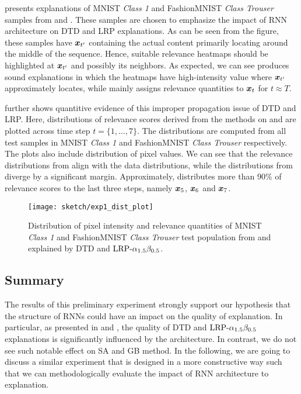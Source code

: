 \addfigure{\ref{fig:class_1_comparison}} presents explanations of MNIST \textit{Class 1} and FashionMNIST \textit{Class Trouser} samples from  and . These samples are chosen to emphasize the impact of RNN architecture on DTD and LRP explanations. As can be seen from the figure, these samples have $\boldsymbol{x}_{t'}$ containing the actual content primarily locating around the middle of the sequence. Hence, suitable relevance heatmaps should be highlighted at $\boldsymbol{x}_{t'}$ and possibly its neighbors.  As expected, we can see  produces sound explanations in which the heatmaps have high-intensity value where $\boldsymbol{x}_{t'}$ approximately locates, while  mainly assigns relevance quantities to $\boldsymbol{x}_{t}$ for $t \approx T$. 

\addfigure{\ref{fig:exp1_dist_plot}} further shows quantitive evidence of this improper propagation issue of DTD and LRP. Here, distributions of relevance scores derived from the methods on  and  are plotted across time step $t = \{ 1, \dots, 7 \}$. The distributions are computed from all test samples in MNIST \textit{Class 1} and FashionMNIST \textit{Class Trouser} respectively. The plots also include distribution of pixel  values.  We can see that the relevance distributions from  align with the data distributions, while  the distributions from   diverge by a significant margin. Approximately,  distributes more than 90\% of relevance scores to the last three steps, namely $\boldsymbol{x}_5$, $\boldsymbol{x}_6$ and $\boldsymbol{x}_7$.


 \begin{figure}[!htb]
\centering
\texttt{[image: sketch/exp1\_dist\_plot]}
\caption{Distribution of pixel intensity and relevance quantities of MNIST \textit{Class 1} and FashionMNIST \textit{Class Trouser}  test population from  and  explained by DTD and $\text{LRP-}\alpha_{1.5}\beta_{0.5}$.} 
\label{fig:exp1_dist_plot}
\end{figure}

\subsection{Summary}
The results of this preliminary experiment strongly support our hypothesis that the structure of RNNs could have an impact on the quality of  explanation.  In particular,  as presented in \addfigure{\ref{fig:class_1_comparison}} and \addfigure{\ref{fig:exp1_dist_plot}}, the quality of DTD and $\text{LRP-}\alpha_{1.5}\beta_{0.5}$ explanations is significantly influenced by the architecture. In contrast, we do not see such notable effect on SA and GB method.  In the following, we are going to discuss a similar experiment that is designed in a more constructive way such that we can methodologically evaluate the impact of RNN architecture to explanation.


